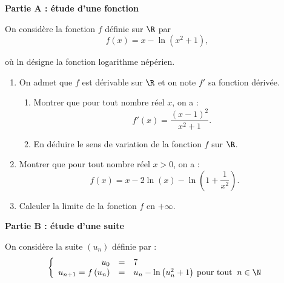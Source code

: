 \medskip

\begin{center}\textbf{Partie A : étude d'une fonction} \end{center}

On considère la fonction $f$ définie sur $\R$ par 
\[f(x) = x - \ln \left(x^2 + 1\right),\]

où ln désigne la fonction logarithme népérien.

\medskip

\begin{enumerate}
\item On admet que $f$ est dérivable sur $\R$ et on note $f'$ sa fonction dérivée.
	\begin{enumerate}
		\item Montrer que pour tout nombre réel $x$, on a :
\[f'(x) = \dfrac{(x - 1)^2}{ x^2 + 1}.\]

		\item En déduire le sens de variation de la fonction $f$ sur $\R$.
	\end{enumerate}
\item Montrer que pour tout nombre réel $x > 0$, on a :
\[f(x) = x - 2\ln (x) - \ln \left(1 + \dfrac{1}{x^2}\right).\]

\item Calculer la limite de la fonction $f$ en $+\infty$.
\end{enumerate}

\begin{center}\textbf{Partie B : étude d'une suite}
 \end{center}

On considère la suite $\left(u_n\right)$ définie par : 
\[\left\{\begin{array}{r c l}
u_0& =&7\\
u_{n+1} = f\left(u_n\right)& =&u_n - \ln\left(u_n^2 + 1\right)\:\text{pour tout }\:n \in \N
\end{array}\right.\]

